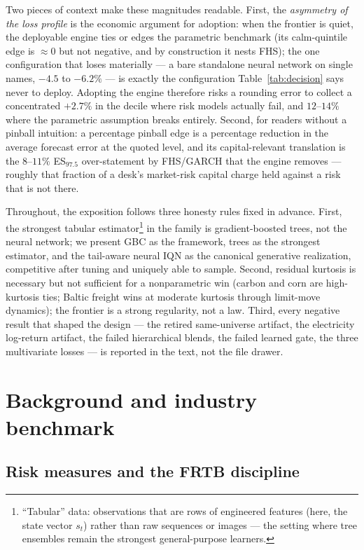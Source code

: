 \documentclass[11pt]{article}
\theoremstyle{remark}
\begin{document}
Two pieces of context make these magnitudes readable. First, the
\emph{asymmetry of the loss profile} is the economic argument for
adoption: when the frontier is quiet, the deployable engine ties or
edges the parametric benchmark (its calm-quintile edge is $\approx 0$
but not negative, and by construction it nests FHS); the one
configuration that loses materially --- a bare standalone neural network
on single names, $-4.5$ to $-6.2\%$ --- is exactly the configuration
Table~\ref{tab:decision} says never to deploy. Adopting the engine
therefore risks a rounding error to collect a concentrated $+2.7\%$ in
the decile where risk models actually fail, and $12$--$14\%$ where the
parametric assumption breaks entirely. Second, for readers without a
pinball intuition: a percentage pinball edge is a percentage reduction
in the average forecast error at the quoted level, and its
capital-relevant translation is the $8$--$11\%$ ES$_{97.5}$
over-statement by FHS/GARCH that the engine removes --- roughly that
fraction of a desk's market-risk capital charge held against a risk
that is not there.

Throughout, the exposition follows three honesty rules fixed in advance.
First, the strongest tabular estimator\footnote{``Tabular'' data:
observations that are rows of engineered features (here, the state
vector $s_t$) rather than raw sequences or images --- the setting where
tree ensembles remain the strongest general-purpose learners.} in the
family is gradient-boosted
trees, not the neural network; we present GBC as the framework, trees as
the strongest estimator, and the tail-aware neural IQN as the canonical
generative realization, competitive after tuning and uniquely able to
sample. Second, residual kurtosis is necessary but not sufficient for a
nonparametric win (carbon and corn are high-kurtosis ties; Baltic
freight wins at moderate kurtosis through limit-move dynamics); the
frontier is a strong regularity, not a law. Third, every negative result
that shaped the design --- the retired same-universe artifact, the
electricity log-return artifact, the failed hierarchical blends, the
failed learned gate, the three multivariate losses --- is reported in
the text, not the file drawer.

\section{Background and industry benchmark}\label{sec:background}

\subsection{Risk measures and the FRTB discipline}
\end{document}
